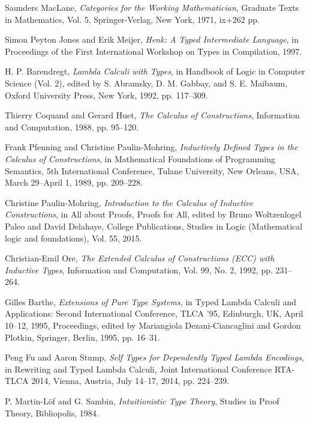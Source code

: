 \documentclass{article}
\begin{document}
\begin{thebibliography}{99}

Saunders MacLane,
\textit{Categories for the Working Mathematician},
Graduate Texts in Mathematics, Vol. 5, Springer-Verlag, New York, 1971, ix+262 pp.

Simon Peyton Jones and Erik Meijer,
\textit{Henk: A Typed Intermediate Language},
in Proceedings of the First International Workshop on Types in Compilation, 1997.

H. P. Barendregt,
\textit{Lambda Calculi with Types},
in Handbook of Logic in Computer Science (Vol. 2), edited by S. Abramsky, D. M. Gabbay, and S. E. Maibaum,
Oxford University Press, New York, 1992, pp. 117--309.

Thierry Coquand and Gerard Huet,
\textit{The Calculus of Constructions},
Information and Computation, 1988, pp. 95--120.

Frank Pfenning and Christine Paulin-Mohring,
\textit{Inductively Defined Types in the Calculus of Constructions},
in Mathematical Foundations of Programming Semantics, 5th International Conference, Tulane University, New Orleans, USA, March 29–April 1, 1989, pp. 209--228.

Christine Paulin-Mohring,
\textit{Introduction to the Calculus of Inductive Constructions},
in All about Proofs, Proofs for All, edited by Bruno Woltzenlogel Paleo and David Delahaye,
College Publications, Studies in Logic (Mathematical logic and foundations), Vol. 55, 2015.

Christian-Emil Ore,
\textit{The Extended Calculus of Constructions (ECC) with Inductive Types},
Information and Computation, Vol. 99, No. 2, 1992, pp. 231--264.

Gilles Barthe,
\textit{Extensions of Pure Type Systems},
in Typed Lambda Calculi and Applications: Second International Conference, TLCA '95, Edinburgh, UK, April 10--12, 1995, Proceedings,
edited by Mariangiola Dezani-Ciancaglini and Gordon Plotkin,
Springer, Berlin, 1995, pp. 16--31.

Peng Fu and Aaron Stump,
\textit{Self Types for Dependently Typed Lambda Encodings},
in Rewriting and Typed Lambda Calculi, Joint International Conference RTA-TLCA 2014, Vienna, Austria, July 14–17, 2014, pp. 224--239.

P. Martin-Löf and G. Sambin,
\textit{Intuitionistic Type Theory},
Studies in Proof Theory, Bibliopolis, 1984.


\end{thebibliography}
\end{document}
